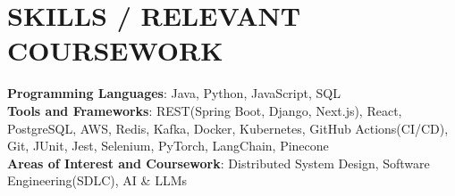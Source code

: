 \documentclass[letterpaper,11pt]{article}
\newcommand{\SectionListBegin}{\begin{itemize}[leftmargin=0.15in, label={}]}
\newcommand{\SectionListEnd}{\end{itemize}}
\newcommand{\swallow}[1]{}
\begin{document}
\section{SKILLS / RELEVANT COURSEWORK}
  \SectionListBegin
    \small{\item{
    \vspace{1mm}
     \textbf{Programming Languages}{: Java, Python, JavaScript, SQL} \\
     \vspace{1mm}
     \textbf{Tools and Frameworks}{:  REST(Spring Boot, Django, Next.js), React, PostgreSQL, AWS, Redis, Kafka, Docker, Kubernetes, GitHub Actions(CI/CD), Git, JUnit, Jest, Selenium, PyTorch, LangChain, Pinecone}\\
     \vspace{1mm}
     \textbf{Areas of Interest and Coursework}{: Distributed System Design, Software Engineering(SDLC), AI \& LLMs  \swallow{Software Engineering (SDLC), Object Oriented Design (OOD), Computer Architecture, Data Structures \& Algorithms} } \\
     \vspace{1mm}
    }}
  \SectionListEnd


\end{document}
